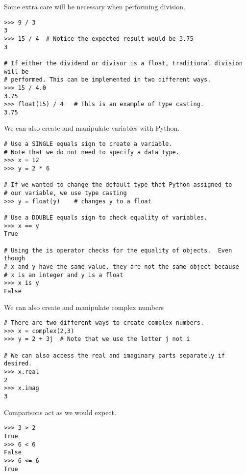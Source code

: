 Some extra care will be necessary when performing division.
\begin{lstlisting}
>>> 9 / 3
3
>>> 15 / 4	# Notice the expected result would be 3.75
3

# If either the dividend or divisor is a float, traditional division will be
# performed. This can be implemented in two different ways. 
>>> 15 / 4.0
3.75
>>> float(15) / 4	# This is an example of type casting.
3.75

\end{lstlisting}

We can also create and manipulate variables with Python.

\begin{lstlisting}
# Use a SINGLE equals sign to create a variable.
# Note that we do not need to specify a data type.
>>> x = 12
>>> y = 2 * 6

# If we wanted to change the default type that Python assigned to
# our variable, we use type casting
>>> y = float(y)	# changes y to a float

# Use a DOUBLE equals sign to check equality of variables.
>>> x == y  
True

# Using the is operator checks for the equality of objects.  Even though
# x and y have the same value, they are not the same object because
# x is an integer and y is a float
>>> x is y
False                   
\end{lstlisting}

We can also create and manipulate complex numbers
\begin{lstlisting}
# There are two different ways to create complex numbers.
>>> x = complex(2,3)
>>> y = 2 + 3j	# Note that we use the letter j not i

# We can also access the real and imaginary parts separately if desired.
>>> x.real
2
>>> x.imag
3
\end{lstlisting}

Comparisons act as we would expect.
\begin{lstlisting}
>>> 3 > 2
True
>>> 6 < 6
False
>>> 6 <= 6
True
\end{lstlisting}


